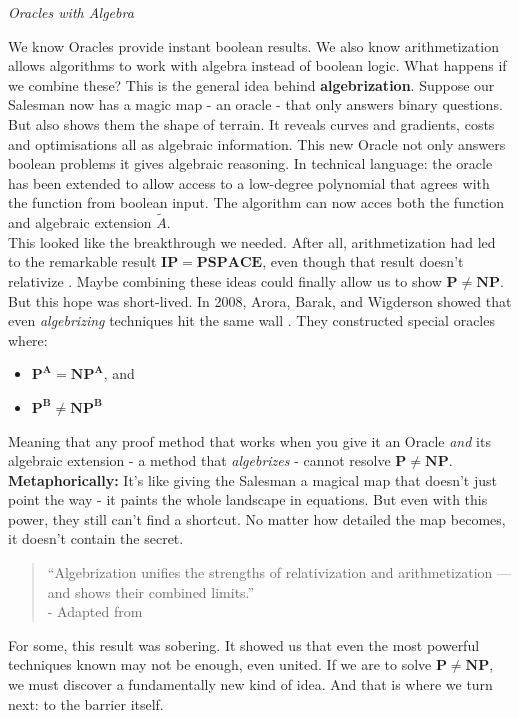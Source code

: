 \documentclass[12pt]{report}
\begin{document}
\begin{center}
    \vspace{0cm}
    {\Large\itshape Oracles with Algebra\par}
\end{center}
We know Oracles provide instant boolean results.
We also know arithmetization allows algorithms to work with algebra instead of boolean logic. 
What happens if we combine these?
This is the general idea behind \textbf{algebrization}.
Suppose our Salesman now has a magic map - an oracle - that only answers binary questions.
But also shows them the shape of terrain.
It reveals curves and gradients, costs and optimisations all as algebraic information.
This new Oracle not only answers boolean problems it gives algebraic reasoning.
In technical language: the oracle has been extended to allow access to a low-degree polynomial that agrees with the function from boolean input.
The algorithm can now acces both the function and algebraic extension $\tilde{A}$.\\
\vspace{0.3cm}
This looked like the breakthrough we needed.
After all, arithmetization had led to the remarkable result $\mathbf{IP = PSPACE}$, even though that result doesn't relativize \citep{arora2009}.
Maybe combining these ideas could finally allow us to show $\mathbf{P \ne NP}$.
But this hope was short-lived.
In 2008, Arora, Barak, and Wigderson showed that even \textit{algebrizing} techniques hit the same wall \citep{arora2008algebrization}.
They constructed special oracles where:
\begin{itemize}
    \item $\mathbf{P^A = NP^A}$, and
    \item $\mathbf{P^B \ne NP^B}$
\end{itemize}
Meaning that any proof method that works when you give it an Oracle \textit{and} its algebraic extension - a method that \textit{algebrizes} - cannot resolve $\mathbf{P \ne NP}$.\\
\vspace{0.3cm}
\textbf{Metaphorically:}  
It's like giving the Salesman a magical map that doesn't just point the way - it paints the whole landscape in equations.
But even with this power, they still can't find a shortcut.
No matter how detailed the map becomes, it doesn't contain the secret.
\begin{quote}
    “Algebrization unifies the strengths of relativization and arithmetization — and shows their combined limits.”\\
    - Adapted from \cite{arora2008algebrization}
\end{quote}
For some, this result was sobering.
It showed us that even the most powerful techniques known may not be enough, even united.
If we are to solve $\mathbf{P \ne NP}$, we must discover a fundamentally new kind of idea.
And that is where we turn next: to the barrier itself.
\end{document}
